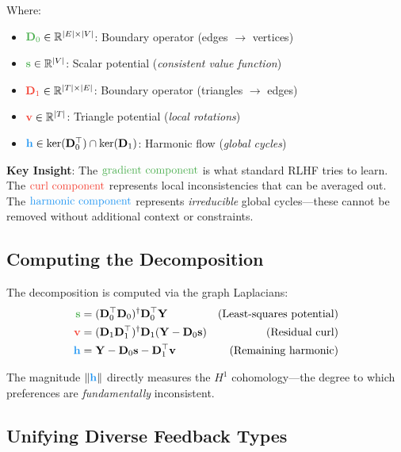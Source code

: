 \documentclass{article}
\begin{document}
Where:
\begin{itemize}[leftmargin=*]
    \item $\textcolor{gradcolor}{\mathbf{D}_0} \in \mathbb{R}^{|E| \times |V|}$: Boundary operator (edges $\to$ vertices)
    \item $\textcolor{gradcolor}{\mathbf{s}} \in \mathbb{R}^{|V|}$: Scalar potential (\emph{consistent value function})
    \item $\textcolor{curlcolor}{\mathbf{D}_1} \in \mathbb{R}^{|T| \times |E|}$: Boundary operator (triangles $\to$ edges)
    \item $\textcolor{curlcolor}{\mathbf{v}} \in \mathbb{R}^{|T|}$: Triangle potential (\emph{local rotations})
    \item $\textcolor{harmcolor}{\mathbf{h}} \in \ker(\mathbf{D}_0^\top) \cap \ker(\mathbf{D}_1)$: Harmonic flow (\emph{global cycles})
\end{itemize}

\textbf{Key Insight}: The $\textcolor{gradcolor}{\text{gradient component}}$ is what standard RLHF tries to learn. The $\textcolor{curlcolor}{\text{curl component}}$ represents local inconsistencies that can be averaged out. The $\textcolor{harmcolor}{\text{harmonic component}}$ represents \emph{irreducible} global cycles---these cannot be removed without additional context or constraints.

\subsection{Computing the Decomposition}

The decomposition is computed via the graph Laplacians:
\begin{align}
\textcolor{gradcolor}{\mathbf{s}} &= (\mathbf{D}_0^\top \mathbf{D}_0)^\dagger \mathbf{D}_0^\top \mathbf{Y} & \text{(Least-squares potential)} \\
\textcolor{curlcolor}{\mathbf{v}} &= (\mathbf{D}_1 \mathbf{D}_1^\top)^\dagger \mathbf{D}_1 (\mathbf{Y} - \mathbf{D}_0 \mathbf{s}) & \text{(Residual curl)} \\
\textcolor{harmcolor}{\mathbf{h}} &= \mathbf{Y} - \mathbf{D}_0 \mathbf{s} - \mathbf{D}_1^\top \mathbf{v} & \text{(Remaining harmonic)}
\end{align}

The magnitude $\|\textcolor{harmcolor}{\mathbf{h}}\|$ directly measures the $H^1$ cohomology---the degree to which preferences are \emph{fundamentally} inconsistent.

\subsection{Unifying Diverse Feedback Types}
\end{document}
